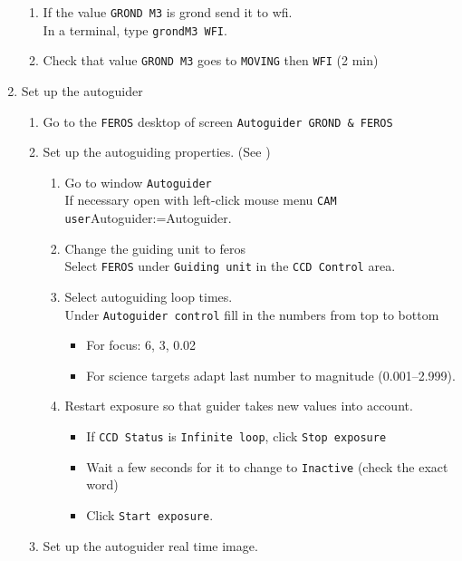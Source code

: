 \documentclass[11pt,fleqn,a4paper]{book}
\makeatletter
\def\menu#1#2{\texttt{#1}\ifx{}#2\else\@for\@x:=#2\do{$\rightarrow$\texttt{\@x}}\fi}
\def\mmenu#1#2{left-click mouse menu \menu{#1}{#2}}
\makeatother
\begin{document}
\begin{enumerate}
\begin{enumerate}
    \item If the value \texttt{GROND \gls{M3}} is \gls{grond} send it to \gls{wfi}.\\
          In a terminal, type \texttt{\gls{grondM3} WFI}.
    \item Check that value \texttt{GROND \gls{M3}} goes to \texttt{MOVING} then \texttt{WFI} (2 min)
  \end{enumerate}
  \item Set up the autoguider\label{list:autoguiderFeros} 
  \begin{enumerate}
    \item Go to the \texttt{FEROS} \gls{desktop} of screen \texttt{Autoguider GROND \& FEROS}
    \item Set up the autoguiding properties. (See )
    \begin{enumerate}
      \item Go to window \texttt{Autoguider}\\
            If necessary open with \mmenu{CAM user}{Autoguider}.
      \item Change the guiding unit to \gls{feros}\\
            Select \texttt{FEROS} under \texttt{Guiding unit} in the \texttt{CCD Control} area. 
      \item Select autoguiding loop times.\\
            Under \texttt{Autoguider control} fill in the numbers from top to bottom
      \begin{itemize}
        \item For \gls{focus}: 6, 3, 0.02
        \item For science targets adapt last number to magnitude (0.001--2.999).
      \end{itemize}
      \item Restart exposure so that guider takes new values into account.
      \begin{itemize}
        \item If \texttt{CCD Status} is \texttt{Infinite loop}, click \texttt{Stop exposure}
        \item Wait a few seconds for it to change to \texttt{Inactive} (check the exact word)%
        \item Click \texttt{Start exposure}.
      \end{itemize}
    \end{enumerate}
    \item Set up the autoguider real time image.
    \begin{enumerate}

\end{enumerate}
\end{enumerate}
\end{enumerate}
\end{document}
